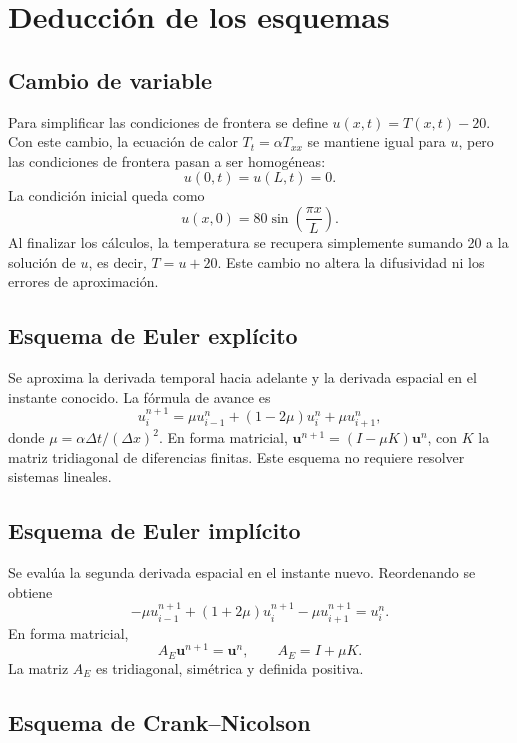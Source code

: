 \documentclass[12pt, letterpaper]{article}
\begin{document}
\section{Deducción de los esquemas}

\subsection{Cambio de variable}

Para simplificar las condiciones de frontera se define \(u(x,t)=T(x,t)-20\). Con este cambio, la ecuación de calor \(T_t = \alpha T_{xx}\) se mantiene igual para \(u\), pero las condiciones de frontera pasan a ser homogéneas:
\[
u(0,t)=u(L,t)=0.
\]
La condición inicial queda como
\[
u(x,0)=80\sin\left(\frac{\pi x}{L}\right).
\]
Al finalizar los cálculos, la temperatura se recupera simplemente sumando 20 a la solución de \(u\), es decir, \(T=u+20\). Este cambio no altera la difusividad ni los errores de aproximación.

\subsection{Esquema de Euler explícito}

Se aproxima la derivada temporal hacia adelante y la derivada espacial en el instante conocido. La fórmula de avance es
\[
u_i^{n+1} = \mu u_{i-1}^n + (1-2\mu)u_i^n + \mu u_{i+1}^n,
\]
donde \(\mu = \alpha \Delta t/(\Delta x)^2\). En forma matricial, \(\mathbf{u}^{n+1} = (I-\mu K)\mathbf{u}^n\), con \(K\) la matriz tridiagonal de diferencias finitas. Este esquema no requiere resolver sistemas lineales.

\subsection{Esquema de Euler implícito}

Se evalúa la segunda derivada espacial en el instante nuevo. Reordenando se obtiene
\[
-\mu u_{i-1}^{n+1} + (1+2\mu)u_i^{n+1} - \mu u_{i+1}^{n+1} = u_i^n.
\]
En forma matricial,
\[
A_E \mathbf{u}^{n+1} = \mathbf{u}^n, \qquad A_E = I+\mu K.
\]
La matriz \(A_E\) es tridiagonal, simétrica y definida positiva.

\subsection{Esquema de Crank--Nicolson}
\end{document}
